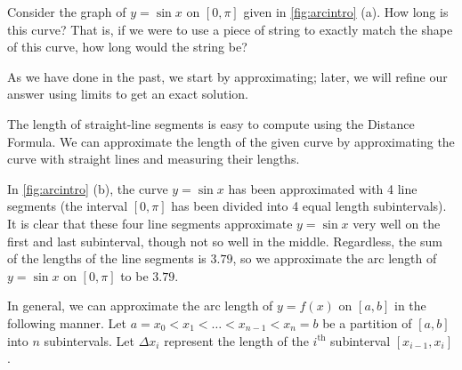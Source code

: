 Consider the graph of $y=\sin x$ on $[0,\pi]$ given in \autoref{fig:arcintro} (a). How long is this curve? That is, if we were to use a piece of string to exactly match the shape of this curve, how long would the string be?

As we have done in the past, we start by approximating; later, we will refine our answer using limits to get an exact solution.

The length of straight-line segments is easy to compute using the Distance Formula. We can approximate the length of the given curve by approximating the curve with straight lines and measuring their lengths. 

In \autoref{fig:arcintro} (b), the curve $y=\sin x$ has been approximated with 4 line segments (the interval $[0,\pi]$ has been divided into 4 equal length subintervals). It is clear that these four line segments approximate $y=\sin x$ very well on the first and last subinterval, though not so well in the middle. Regardless, the sum of the lengths of the line segments is $3.79$, so we approximate the arc length of $y=\sin x$ on $[0,\pi]$ to be $3.79$. 


In general,  we can approximate the arc length of $y=f(x)$ on $[a,b]$ in the following manner. Let $a=x_0 < x_1 < \dotso < x_{n-1}< x_n=b$ be a partition of $[a,b]$ into $n$ subintervals. Let $\Delta x_i$ represent the length of the $i^{\text{th}}$ subinterval $[x_{i-1},x_i]$.


